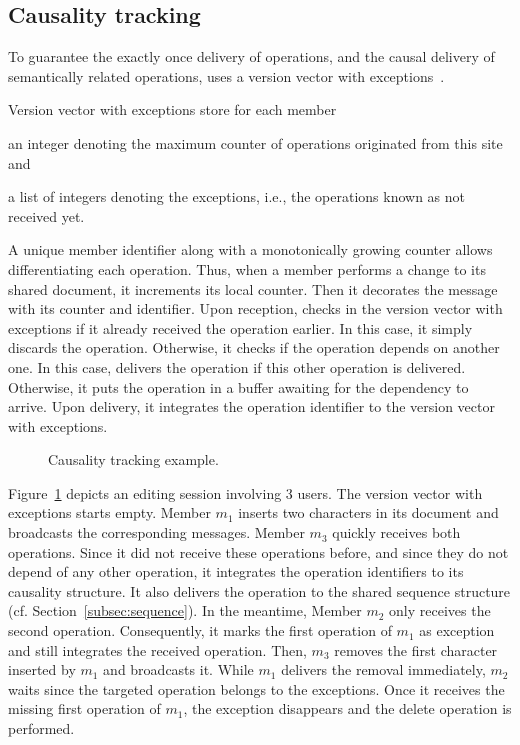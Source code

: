 \subsection{Causality tracking}
\label{subsec:causality}

To guarantee the exactly once delivery of operations, and the causal delivery of
semantically related operations, \CRATE uses a version vector with
exceptions~\cite{malkhi2007concise, mukund2014optimized}.

\begin{asparadesc}
\item [Version vector with exceptions] store for each member
  \begin{inparaenum}[(i)]
  \item an integer denoting the maximum counter of operations originated from
    this site and
  \item a list of integers denoting the exceptions, i.e., the operations known
    as not received yet.
  \end{inparaenum}
  
  A unique member identifier along with a monotonically growing counter allows
  differentiating each operation. Thus, when a member performs a change to its
  shared document, it increments its local counter. Then it decorates the
  message with its counter and identifier. Upon reception, \CRATE checks in the
  version vector with exceptions if it already received the operation
  earlier. In this case, it simply discards the operation.  Otherwise, it checks
  if the operation depends on another one. In this case, \CRATE delivers the
  operation if this other operation is delivered. Otherwise, it puts the
  operation in a buffer awaiting for the dependency to arrive. Upon delivery, it
  integrates the operation identifier to the version vector with exceptions.

  \begin{figure}
    
    \caption{\label{fig:timeline} Causality tracking example.}
  \end{figure}

  Figure~\ref{fig:timeline} depicts an editing session involving 3 users. The
  version vector with exceptions starts empty. Member $m_1$ inserts two
  characters in its document and broadcasts the corresponding messages. Member
  $m_3$ quickly receives both operations. Since it did not receive these
  operations before, and since they do not depend of any other operation, it
  integrates the operation identifiers to its causality structure. It also
  delivers the operation to the shared sequence structure
  (cf. Section~\ref{subsec:sequence}). In the meantime, Member $m_2$ only
  receives the second operation. Consequently, it marks the first operation of
  $m_1$ as exception and still integrates the received operation. Then, $m_3$
  removes the first character inserted by $m_1$ and broadcasts it. While $m_1$
  delivers the removal immediately, $m_2$ waits since the targeted operation
  belongs to the exceptions. Once it receives the missing first operation of
  $m_1$, the exception disappears and the delete operation is performed.


\end{asparadesc}
